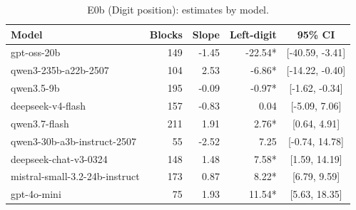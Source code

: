 \begin{table}[t]
\centering
\caption{E0b (Digit position): estimates by model.}
\label{tab:e0bmodel}
\small
\begin{tabular}{lrrrc}
\toprule
Model & Blocks & Slope & Left-digit & 95\% CI \\
\midrule
gpt-oss-20b & 149 & -1.45 & -22.54* & [-40.59, -3.41] \\
qwen3-235b-a22b-2507 & 104 & 2.53 & -6.86* & [-14.22, -0.40] \\
qwen3.5-9b & 195 & -0.09 & -0.97* & [-1.62, -0.34] \\
deepseek-v4-flash & 157 & -0.83 & 0.04 & [-5.09, 7.06] \\
qwen3.7-flash & 211 & 1.91 & 2.76* & [0.64, 4.91] \\
qwen3-30b-a3b-instruct-2507 &  55 & -2.52 & 7.25 & [-0.74, 14.78] \\
deepseek-chat-v3-0324 & 148 & 1.48 & 7.58* & [1.59, 14.19] \\
mistral-small-3.2-24b-instruct & 173 & 0.87 & 8.22* & [6.79, 9.59] \\
gpt-4o-mini &  75 & 1.93 & 11.54* & [5.63, 18.35] \\
\bottomrule
\end{tabular}
\end{table}
